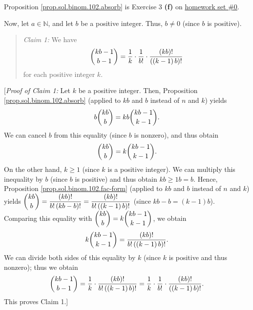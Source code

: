 \documentclass[paper=a4, fontsize=12pt]{scrartcl}%
\theoremstyle{plainsl}
\theoremstyle{definition}
\theoremstyle{remark}
\newenvironment{statement}{\begin{quote}}{\end{quote}}
\begin{document}
Proposition \ref{prop.sol.binom.102.absorb} is Exercise 3 \textbf{(f)} on
\href{http://www.cip.ifi.lmu.de/~grinberg/t/19s/hw0s.pdf}{homework set \#0}.

Now, let $a\in\mathbb{N}$, and let $b$ be a positive integer. Thus, $b\neq0$
(since $b$ is positive).

\begin{statement}
\textit{Claim 1:} We have
\[
\dbinom{kb-1}{b-1}=\dfrac{1}{k}\cdot\dfrac{1}{b!}\cdot\dfrac{\left(
kb\right)  !}{\left(  \left(  k-1\right)  b\right)  !}%
\]
for each positive integer $k$.
\end{statement}

[\textit{Proof of Claim 1:} Let $k$ be a positive integer. Then, Proposition
\ref{prop.sol.binom.102.absorb} (applied to $kb$ and $b$ instead of $n$ and
$k$) yields%
\[
b\dbinom{kb}{b}=kb\dbinom{kb-1}{k-1}.
\]
We can cancel $b$ from this equality (since $b$ is nonzero), and thus obtain%
\[
\dbinom{kb}{b}=k\dbinom{kb-1}{k-1}.
\]
On the other hand, $k\geq1$ (since $k$ is a positive integer). We can multiply
this inequality by $b$ (since $b$ is positive) and thus obtain $kb\geq1b=b$.
Hence, Proposition \ref{prop.sol.binom.102.fac-form} (applied to $kb$ and $b$
instead of $n$ and $k$) yields $\dbinom{kb}{b}=\dfrac{\left(  kb\right)
!}{b!\left(  kb-b\right)  !}=\dfrac{\left(  kb\right)  !}{b!\left(  \left(
k-1\right)  b\right)  !}$ (since $kb-b=\left(  k-1\right)  b$). Comparing this
equality with $\dbinom{kb}{b}=k\dbinom{kb-1}{k-1}$, we obtain%
\[
k\dbinom{kb-1}{k-1}=\dfrac{\left(  kb\right)  !}{b!\left(  \left(  k-1\right)
b\right)  !}.
\]
We can divide both sides of this equality by $k$ (since $k$ is positive and
thus nonzero); thus we obtain%
\[
\dbinom{kb-1}{b-1}=\dfrac{1}{k}\cdot\dfrac{\left(  kb\right)  !}{b!\left(
\left(  k-1\right)  b\right)  !}=\dfrac{1}{k}\cdot\dfrac{1}{b!}\cdot
\dfrac{\left(  kb\right)  !}{\left(  \left(  k-1\right)  b\right)  !}.
\]
This proves Claim 1.]
\end{document}
